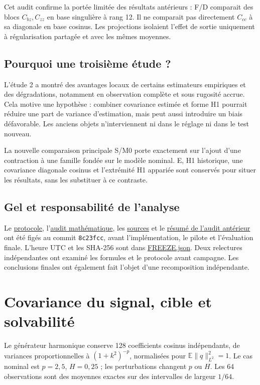 \documentclass[11pt,a4paper]{article}
\newcommand{\src}[2]{\href{\DataURL{#1}}{#2}}
\begin{document}
Cet audit confirme la portée limitée des résultats antérieurs : F/D comparait des blocs $C_{bz},C_{zz}$ en base singulière à rang 12. Il ne comparait pas directement $C_{cc}$ à sa diagonale en base cosinus. Les projections isolaient l'effet de sortie uniquement à régularisation partagée et avec les mêmes moyennes.

\subsection{Pourquoi une troisième étude ?}
L'étude 2 a montré des avantages locaux de certains estimateurs empiriques et des dégradations, notamment en observation complète et sous rugosité accrue. Cela motive une hypothèse : combiner covariance estimée et forme H1 pourrait réduire une part de variance d'estimation, mais peut aussi introduire un biais défavorable. Les anciens objets n'interviennent ni dans le réglage ni dans le test nouveau.

La nouvelle comparaison principale S/M0 porte exactement sur l'ajout d'une contraction à une famille fondée sur le modèle nominal. E, H1 historique, une covariance diagonale cosinus et l'extrémité H1 appariée sont conservés pour situer les résultats, sans les substituer à ce contraste.

\subsection{Gel et responsabilité de l'analyse}
Le \src{PROTOCOL.md}{protocole}, l'\src{MATHEMATICS.md}{audit mathématique}, les \src{SOURCES.md}{sources} et le \src{AUDIT_STUDY2.md}{résumé de l'audit antérieur} ont été figés au commit \texttt{8c23fcc}, avant l'implémentation, le pilote et l'évaluation finale. L'heure UTC et les SHA-256 sont dans \src{FREEZE.json}{FREEZE.json}. Deux relectures indépendantes ont examiné les formules et le protocole avant campagne. Les conclusions finales ont également fait l'objet d'une recomposition indépendante.

\newpage
\section{Covariance du signal, cible et solvabilité}
Le générateur harmonique conserve 128 coefficients cosinus indépendants, de variances proportionnelles à $(1+k^2)^{-p}$, normalisées pour $\mathbb E\|q\|_{L^2}^2=1$. Le cas nominal est $p=2,5$, $H=0,25$ ; les perturbations changent $p$ ou $H$. Les 64 observations sont des moyennes exactes sur des intervalles de largeur $1/64$.
\end{document}
